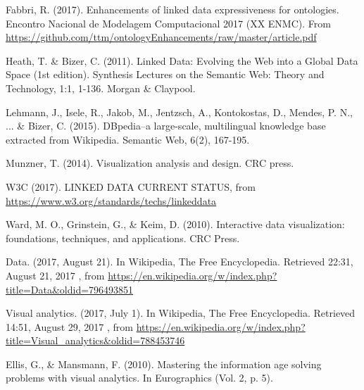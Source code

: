 \documentclass[12pt,fleqn]{article}
\begin{document}
\begin{thebibliography}{99}
\fontsize{11}{0}\selectfont
{}
	Fabbri, R. (2017). Enhancements of linked data expressiveness for ontologies.
		Encontro Nacional de Modelagem Computacional 2017 (XX ENMC).
		From \url{https://github.com/ttm/ontologyEnhancements/raw/master/article.pdf}

	Heath, T. \& Bizer, C. (2011). Linked Data: Evolving the Web into a Global Data Space (1st edition). Synthesis Lectures on the Semantic Web: Theory and Technology, 1:1, 1-136. Morgan \& Claypool.

	Lehmann, J., Isele, R., Jakob, M., Jentzsch, A., Kontokostas, D., Mendes, P. N., ... \& Bizer, C. (2015). DBpedia–a large-scale, multilingual knowledge base extracted from Wikipedia. Semantic Web, 6(2), 167-195.

	Munzner, T. (2014). Visualization analysis and design. CRC press.

	W3C (2017). LINKED DATA CURRENT STATUS, from \url{https://www.w3.org/standards/techs/linkeddata}

	Ward, M. O., Grinstein, G., \& Keim, D. (2010). Interactive data visualization: foundations, techniques, and applications. CRC Press.

	Data. (2017, August 21). In Wikipedia, The Free Encyclopedia. Retrieved
		22:31, August 21, 2017
		, from \url{https://en.wikipedia.org/w/index.php?title=Data&oldid=796493851}
        
Visual analytics. (2017, July 1). In Wikipedia, The Free Encyclopedia. Retrieved
14:51, August 29, 2017
, from \url{https://en.wikipedia.org/w/index.php?title=Visual_analytics&oldid=788453746}

Ellis, G., \& Mansmann, F. (2010). Mastering the information age solving problems with visual analytics. In Eurographics (Vol. 2, p. 5).
\end{thebibliography}





\end{document}
